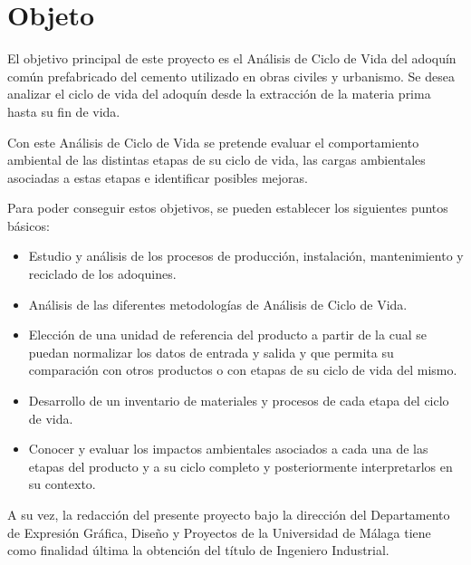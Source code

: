 \chapter{Objeto}\label{cap:objeto}
El objetivo principal de este proyecto es el Análisis de Ciclo de Vida del adoquín común prefabricado del cemento utilizado en obras civiles y urbanismo. Se desea analizar el ciclo de vida del adoquín desde la extracción de la materia prima hasta su fin de vida.

Con este Análisis de Ciclo de Vida se pretende evaluar el comportamiento ambiental de las distintas etapas de su ciclo de vida, las cargas ambientales asociadas a estas etapas e identificar posibles mejoras.

Para poder conseguir estos objetivos, se pueden establecer los siguientes puntos básicos:
\begin{itemize}
\item Estudio y análisis de los procesos de producción, instalación, mantenimiento y reciclado de los adoquines.
\item Análisis de las diferentes metodologías de Análisis de Ciclo de Vida.
\item Elección de una unidad de referencia del producto a partir de la cual se puedan normalizar los datos de entrada y salida y que permita su comparación con otros productos o con etapas de su ciclo de vida del mismo.
\item Desarrollo de un inventario de materiales y procesos de cada etapa del ciclo de vida.
\item Conocer y evaluar los impactos ambientales asociados a cada una de las etapas del producto y a su ciclo completo y posteriormente interpretarlos en su contexto.
\end{itemize}

A su vez, la redacción del presente proyecto bajo la dirección del Departamento de Expresión Gráfica, Diseño y Proyectos de la Universidad de Málaga tiene como finalidad última la obtención del título de Ingeniero Industrial.
